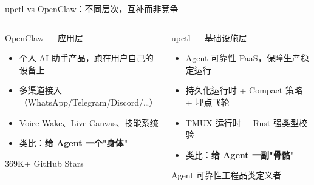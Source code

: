 \documentclass[12pt,aspectratio=169,utf8]{beamer}
\begin{document}
\begin{frame}[shrink=3]{upctl vs OpenClaw：不同层次，互补而非竞争}
  \begin{columns}[T]
    \begin{block}{OpenClaw — 应用层}
      \footnotesize
      \begin{itemize}
        \item 个人 AI 助手产品，跑在用户自己的设备上
        \item 多渠道接入（WhatsApp/Telegram/Discord/\ldots）
        \item Voice Wake、Live Canvas、技能系统
        \item 类比：\textbf{给 Agent 一个"身体"}
      \end{itemize}
      \vspace{4pt}
      \centering\footnotesize 369K+ GitHub Stars
    \end{block}

    \begin{block}{upctl — 基础设施层}
      \footnotesize
      \begin{itemize}
        \item Agent 可靠性 PaaS，保障生产稳定运行
        \item 持久化运行时 + Compact 策略 + 埋点飞轮
        \item TMUX 运行时 + Rust 强类型校验
        \item 类比：\textbf{给 Agent 一副"骨骼"}
      \end{itemize}
      \vspace{4pt}
      \centering\footnotesize Agent 可靠性工程品类定义者
    \end{block}
  \end{columns}

  \vspace{10pt}
  \begin{center}
  \end{center}
\end{frame}
\end{document}
